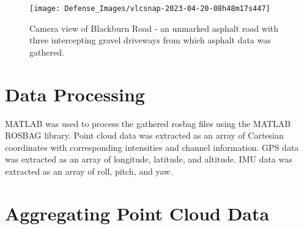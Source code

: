 \documentclass[numbered,pdftex]{ohio-etd}
\begin{document}
{{		
		\begin{figure}[H]
			\centering
			\texttt{[image: Defense\_Images/vlcsnap-2023-04-20-08h48m17s447]}
			\caption[Blackburn Road Camera View]{Camera view of Blackburn Road - an unmarked asphalt road with three intercepting gravel driveways from which asphalt data was gathered.}
			\label{fig:Blackburn_Road_View}
		\end{figure}
					
	} %
		
	\section{Data Processing}\label{sec:data_processing}{

		{MATLAB was used to process the gathered rosbag files using the MATLAB ROSBAG library. Point cloud data was extracted as an array of Cartesian coordinates with corresponding intensities and channel information. GPS data was extracted as an array of longitude, latitude, and altitude. IMU data was extracted as an array of roll, pitch, and yaw.}

	} %
	
%			
%			
	
	\section{Aggregating Point Cloud Data}\label{sec:aggregating_point_cloud_data}{
	
}}
\end{document}
